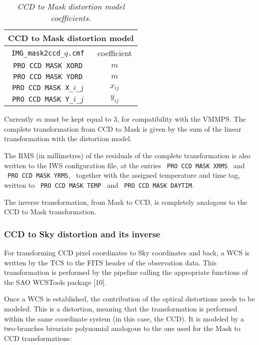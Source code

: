\begin{table}[h]
  \begin{center}
    \begin{tabular}{|c|c|}
    \hline
      \multicolumn{2}{|c|}{\bf CCD to Mask distortion model} \\
    \hline
      {\tt IMG\_mask2ccd\_}$q${\tt.cmf} & coefficient \\
    \hline
      {\tt PRO CCD MASK XORD} & $m$ \\
      {\tt PRO CCD MASK YORD} & $m$ \\
      {\tt PRO CCD MASK X\_}$i${\tt\_}$j$ & $x_{ij}$ \\
      {\tt PRO CCD MASK Y\_}$i${\tt\_}$j$ & $y_{ij}$ \\
    \hline
    \end{tabular}
    \caption{\it CCD to Mask distortion model coefficients.}
    \label{TTCCD2MAS}
  \end{center}
\end{table}

Currently $m$ must be kept equal to $3$, for compatibility with the VMMPS.
The complete transformation from CCD to Mask is given by the sum of
the linear transformation with the distortion model.

The RMS (in millimetres) of the residuals of the complete transformation is 
also written to the IWS configuration file, at the entries 
\ {\tt PRO CCD MASK XRMS} \ and 
\ {\tt PRO CCD MASK YRMS}, \ together with 
the assigned temperature and time tag,
written to \ {\tt PRO CCD MASK TEMP} \ and \ {\tt PRO CCD MASK DAYTIM}.

The inverse transformation, from Mask to CCD, is completely analogous
to the CCD to Mask transformation.

\subsubsection{CCD to Sky distortion and its inverse}
\label{CCD2SKY}

For transforming CCD pixel coordinates to Sky coordinates and back, a 
WCS is written by the TCS to the FITS header of the observation data.
This transformation is performed by the pipeline calling the
appropriate functions of the SAO WCSTools package [10].

Once a WCS is established, the contribution of the optical distortions
needs to be modeled. This is a distortion, meaning that the transformation 
is performed within the same coordinate system (in this case, the CCD).
It is modeled by a two-branches bivariate polynomial analogous to the one 
used for the Mask to CCD transformations:

